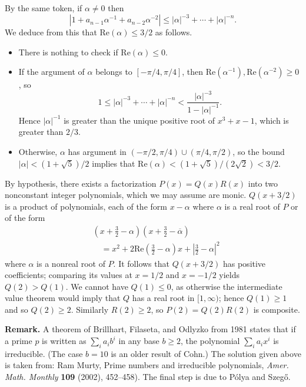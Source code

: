 \documentclass[amssymb,twocolumn,pra,10pt,aps]{revtex4-1}
\begin{document}
\begin{itemize}
By the same token, if $\alpha \neq 0$ then
\[
|1 + a_{n-1} \alpha^{-1} + a_{n-2} \alpha^{-2}| \leq |\alpha|^{-3} + \cdots + |\alpha|^{-n}.
\]
We deduce from this that $\mathrm{Re}(\alpha) \leq 3/2$ as follows.
\begin{itemize}
\item
There is nothing to check if $\mathrm{Re}(\alpha) \leq 0$.
\item
If the argument of $\alpha$ belongs to $[-\pi/4, \pi/4]$, then $\mathrm{Re}(\alpha^{-1}), \mathrm{Re}(\alpha^{-2}) \geq 0$, so
\[
1 \leq |\alpha|^{-3} + \cdots + |\alpha|^{-n} < \frac{|\alpha|^{-3}}{1 - |\alpha|^{-1}}.
\]
Hence $|\alpha|^{-1}$ is greater than the unique positive root of $x^3 + x - 1$, which 
is greater than $2/3$. 
\item
Otherwise, $\alpha$ has argument in $(-\pi/2,\pi/4) \cup (\pi/4,\pi/2)$,
so the bound $|\alpha| < (1 + \sqrt{5})/2$ implies that $\mathrm{Re}(\alpha) < (1 + \sqrt{5})/(2 \sqrt{2}) < 3/2$.
\end{itemize}

By hypothesis, there exists a factorization $P(x) = Q(x)R(x)$ into two nonconstant integer polynomials, which we may assume are monic.
$Q(x + 3/2)$ is a product of polynomials, each of the form $x - \alpha$ where $\alpha$ is a real root of $P$
or of the form
\begin{align*}
&\left( x + \frac{3}{2} - \alpha\right) \left(x + \frac{3}{2} - \overline{\alpha} \right) \\
&\quad = x^2 + 2 \mathrm{Re}\left(\frac{3}{2} - \alpha\right) x + \left|\frac{3}{2} - \alpha \right|^2
\end{align*}
where $\alpha$ is a nonreal root of $P$. It follows that $Q(x+3/2)$ has positive coefficients;
comparing its values at $x=1/2$ and $x=-1/2$ yields $Q(2) > Q(1)$. We cannot have $Q(1) \leq 0$, as otherwise the intermediate value theorem would imply that $Q$ has a real root in $[1, \infty)$; hence $Q(1)  \geq 1$ and so $Q(2) \geq 2$.
Similarly $R(2) \geq 2$, so $P(2) = Q(2) R(2)$ is composite.

\noindent
\textbf{Remark.}
A theorem of Brillhart, Filaseta, and Odlyzko from 1981 states that if a prime $p$ is written as $\sum_i a_i b^i$ in any base $b \geq 2$, the polynomial $\sum_i a_i x^i$ is irreducible.
(The case $b=10$ is an older result of Cohn.) 
The solution given above is taken from: Ram Murty, Prime numbers and irreducible polynomials, \textit{Amer. Math. Monthly} \textbf{109} (2002), 452--458). The final step is due to P\'olya and Szeg\H{o}.


\end{itemize}
\end{document}
